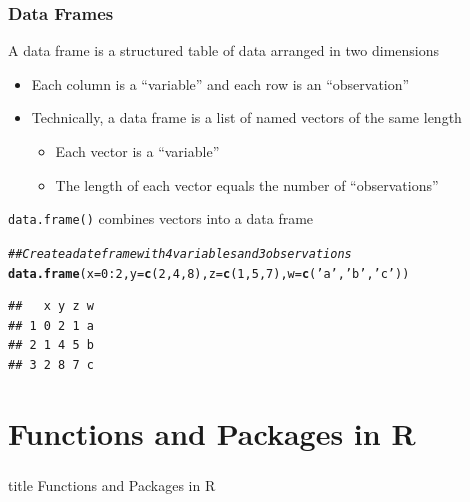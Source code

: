 \documentclass{beamer}\usepackage[]{graphicx}\usepackage[]{xcolor}
\makeatletter
\newcommand{\hlnum}[1]{\textcolor[rgb]{0.686,0.059,0.569}{#1}}%
\newcommand{\hlstr}[1]{\textcolor[rgb]{0.192,0.494,0.8}{#1}}%
\newcommand{\hlcom}[1]{\textcolor[rgb]{0.678,0.584,0.686}{\textit{#1}}}%
\newcommand{\hlopt}[1]{\textcolor[rgb]{0,0,0}{#1}}%
\newcommand{\hlstd}[1]{\textcolor[rgb]{0.345,0.345,0.345}{#1}}%
\newcommand{\hlkwc}[1]{\textcolor[rgb]{0.333,0.667,0.333}{#1}}%
\newcommand{\hlkwd}[1]{\textcolor[rgb]{0.737,0.353,0.396}{\textbf{#1}}}%
\newenvironment{kframe}{%
 \def\at@end@of@kframe{}%
 \ifinner\ifhmode%
  \def\at@end@of@kframe{\end{minipage}}%
  \begin{minipage}{\columnwidth}%
 \fi\fi%
 \def\FrameCommand##1{\hskip\@totalleftmargin \hskip-\fboxsep
 \colorbox{shadecolor}{##1}\hskip-\fboxsep
     \hskip-\linewidth \hskip-\@totalleftmargin \hskip\columnwidth}%
 \MakeFramed {\advance\hsize-\width
   \@totalleftmargin\z@ \linewidth\hsize
   \@setminipage}}%
 {\par\unskip\endMakeFramed%
 \at@end@of@kframe}
\newenvironment{knitrout}{}{} %
\makeatother
\begin{document}
\begin{frame}[fragile]\frametitle{Data Frames}
    A data frame is a structured table of data arranged in two dimensions
    \begin{itemize}
        \item Each column is a ``variable'' and each row is an ``observation''
        \item Technically, a data frame is a list of named vectors of the same length
        \begin{itemize}
            \item Each vector is a ``variable''
            \item The length of each vector equals the number of ``observations''
        \end{itemize}
    \end{itemize}
    \vspace{3ex}
    \texttt{data.frame()} combines vectors into a data frame
\begin{knitrout}\footnotesize
{}\color{fgcolor}\begin{kframe}
\begin{alltt}
\hlcom{## Create a date frame with 4 variables and 3 observations}
\hlkwd{data.frame}\hlstd{(}\hlkwc{x} \hlstd{=} \hlnum{0}\hlopt{:}\hlnum{2}\hlstd{,} \hlkwc{y} \hlstd{=} \hlkwd{c}\hlstd{(}\hlnum{2}\hlstd{,} \hlnum{4}\hlstd{,} \hlnum{8}\hlstd{),} \hlkwc{z} \hlstd{=} \hlkwd{c}\hlstd{(}\hlnum{1}\hlstd{,} \hlnum{5}\hlstd{,} \hlnum{7}\hlstd{),} \hlkwc{w} \hlstd{=} \hlkwd{c}\hlstd{(}\hlstr{'a'}\hlstd{,} \hlstr{'b'}\hlstd{,} \hlstr{'c'}\hlstd{))}
\end{alltt}
\begin{verbatim}
##   x y z w
## 1 0 2 1 a
## 2 1 4 5 b
## 3 2 8 7 c
\end{verbatim}
\end{kframe}
\end{knitrout}
\end{frame}

\section{Functions and Packages in R}
\label{functions}
\begin{frame}\frametitle{}
    \vfill
    \centering
    \begin{beamercolorbox}[center]{title}
        \Large Functions and Packages in R
    \end{beamercolorbox}
    \vfill
\end{frame}
\end{document}
